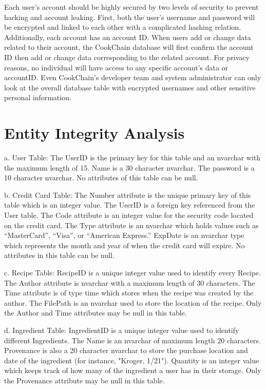 \documentclass{article}
\begin{document}
Each user's account should be highly secured by two levels of security to prevent hacking and account leaking. First, both the user's username and password will be encrypted and linked to each other with a complicated hashing relation. Additionally, each account has an account ID. When users add or change data related to their account, the CookChain database will first confirm the account ID then add or change data corresponding to the related account. For privacy reasons, no individual will have access to any specific account's data or accountID. Even CookChain's developer team and system administrator can only look at the overall database table with encrypted usernames and other sensitive personal information.
\section{Entity Integrity Analysis}
a.	User Table: The UserID is the primary key for this table and an nvarchar with the maximum length of 15. Name is a 30 character nvarchar. The password is a 10 character nvarchar. No attributes of this table can be null.
 
b.	Credit Card Table: The Number attribute is the unique primary key of this table which is an integer value. The UserID is a foreign key referenced from the User table. The Code attribute is an integer value for the security code located on the credit card. The Type attribute is an nvarchar which holds values such as “MasterCard”, “Visa”, or “American Express.” ExpDate is an nvarchar type which represents the month and year of when the credit card will expire. No attributes in this table can be null.

c.	Recipe Table: RecipeID is a unique integer value used to identify every Recipe. The Author attribute is nvarchar with a maximum length of 30 characters. The Time attribute is of type time which stores when the recipe was created by the author. The FilePath is an nvarchar used to store the location of the recipe. Only the Author and Time attributes may be null in this table.

d.	Ingredient Table: IngredientID is a unique integer value used to identify different Ingredients. The Name is an nvarchar of maximum length 20 characters. Provenance is also a 20 character nvarchar to store the purchase location and date of the ingredient (for instance, "Kroger, 1/21"). Quantity is an integer value which keeps track of how many of the ingredient a user has in their storage. Only the Provenance attribute may be null in this table.
\end{document}
